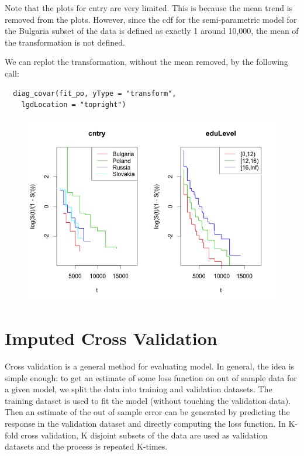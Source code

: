 \documentclass[11pt]{report}
\begin{document}
  Note that the plots for cntry are very limited. This is 
  because the mean trend is removed from the plots. However,
  since the cdf for the semi-parametric model for the 
  Bulgaria subset of the data is defined as exactly 1 around 
  10,000, the mean of the transformation is not defined. 
  
  We can replot the transformation, without the mean removed,
  by the following call:
  
  \begin{verbatim}
  diag_covar(fit_po, yType = "transform",
    lgdLocation = "topright")
  \end{verbatim}

  \begin{figure}
  \includegraphics{transformPlot.png}
  \label{figure:tranformKeepMean}
  \end{figure}


\section{Imputed Cross Validation}

  Cross validation is a general method for evaluating model. In general, 
  the idea is simple enough: to get an estimate of some loss function on
  out of sample data for a given model, we split the data into training
  and validation datasets. The training dataset is used to fit the model
  (without touching the validation data). Then an estimate of the out of
  sample error can be generated by predicting the response in the validation
  dataset and directly computing the loss function. In K-fold cross validation,
  K disjoint subsets of the data are used as validation datasets and the process
  is repeated K-times. 
  
\end{document}
